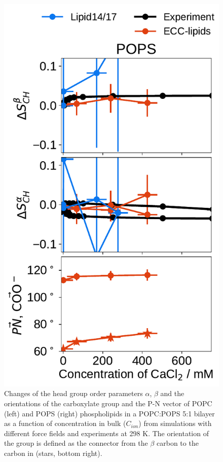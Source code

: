 \begin{figure}[htb!]
  \includegraphics[width=\figwidthsmall]{../img/ecc_pops/order_parameters_changes_ecc-lip_L14_A-B-PN-COO_POPS_cacl.pdf} 
  \caption{\label{fig:delta_ordPar_CaCl_PCPS} 
    Changes of the head group order parameters $\alpha$, $\beta$ and the orientations of the carboxylate group and the P-N vector  
    of POPC (left) and POPS (right) phospholipids in a POPC:POPS 5:1 bilayer as a function of  concentration 
    in bulk ($C_{ion}$) from simulations with different force fields and experiments at 298 K. \citep{roux90}
    The orientation of the  group is defined as 
    the connector from the $\beta$ carbon to the carbon in  (stars, bottom right). 
  } 
\end{figure} 



